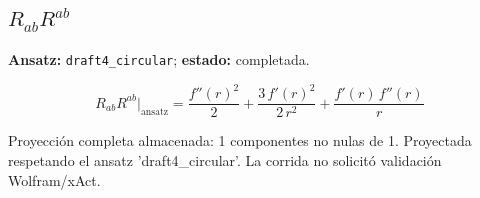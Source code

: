 \documentclass[11pt]{article}
\begin{document}
\subsection*{$ R_{ab}R^{ab} $}
\textbf{Ansatz:} \texttt{draft4\_circular}; \textbf{estado:} completada.\par
\begin{dmath*}[breakdepth={5}]
R_{ab}R^{ab}\big|_{\mathrm{ansatz}} = \frac{{f''\!\left(r\right)}^{2}}{2} + \frac{3\,{f'\!\left(r\right)}^{2}}{2\,{r}^{2}} + \frac{f'\!\left(r\right)\,f''\!\left(r\right)}{r}
\end{dmath*}
\par\smallskip
Proyección completa almacenada: 1 componentes no nulas de 1. Proyectada respetando el ansatz 'draft4\_circular'. La corrida no solicitó validación Wolfram/xAct.\par\medskip
{}
\end{document}
